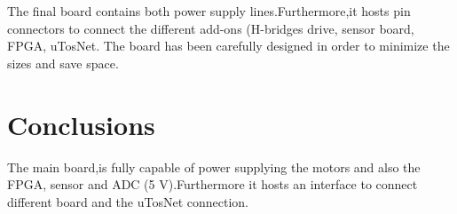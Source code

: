 The final board contains both power supply lines.Furthermore,it hosts pin connectors to connect the different add-ons (H-bridges drive, sensor board, FPGA, uTosNet. The board has been carefully designed in order to minimize the sizes and save space. 
\newpage 
\section{Conclusions}
The main board,is fully capable of power supplying the motors and also the FPGA, sensor and ADC (5 V).Furthermore it hosts an interface to connect different board and the uTosNet connection. 